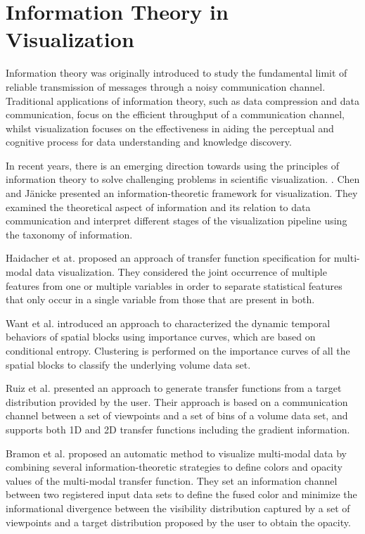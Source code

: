 \section{Information Theory in Visualization}
Information theory \cite{shannon_mathematical_1948} was originally introduced to study the fundamental limit of reliable transmission of messages through a noisy communication channel. Traditional applications of information theory, such as data compression and data communication, focus on the efficient throughput of a communication channel, whilst visualization focuses on the effectiveness in aiding the perceptual and cognitive process for data understanding and knowledge discovery.

In recent years, there is an emerging direction towards using the principles of information theory to solve challenging problems in scientific visualization. \cite{wang_information_2011}. Chen and J{\"a}nicke \cite{chen_information-theoretic_2010} presented an information-theoretic framework for visualization. They examined the theoretical aspect of information and its relation to data communication and interpret different stages of the visualization pipeline using the taxonomy of information.

Haidacher et at. \cite{haidacher_information-based_2008} proposed an approach of transfer function specification for multi-modal data visualization. They considered the joint occurrence of multiple features from one or multiple variables in order to separate statistical features that only occur in a single variable from those that are present in both.

Want et al. \cite{wang_importance-driven_2008} introduced an approach to characterized the dynamic temporal behaviors of spatial blocks using importance curves, which are based on conditional entropy. Clustering is performed on the importance curves of all the spatial blocks to classify the underlying volume data set.

Ruiz et al. \cite{ruiz_automatic_2011} presented an approach to generate transfer functions from a target distribution provided by the user. Their approach is based on a communication channel between a set of viewpoints and a set of bins of a volume data set, and supports both 1D and 2D transfer functions including the gradient information.

Bramon et al. \cite{bramon_information_2013} proposed an automatic method to visualize multi-modal data by combining several information-theoretic strategies to define colors and opacity values of the multi-modal transfer function.
They set an information channel between two registered input data sets to define the fused color and minimize the informational divergence between the visibility distribution captured by a set of viewpoints and a target distribution proposed by the user to obtain the opacity.

